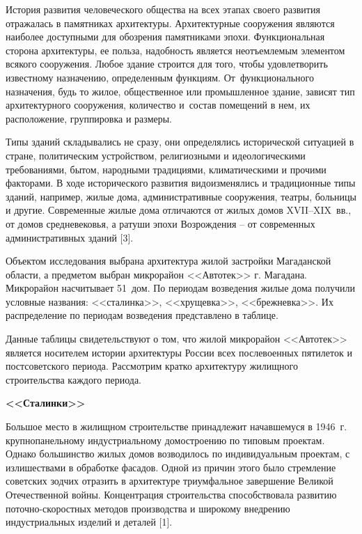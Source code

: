 



\makeProcTitle
{}

История развития человеческого общества на всех этапах своего развития отражалась в памятниках архитектуры. Архитектурные сооружения являются наиболее доступными для обозрения памятниками эпохи. Функциональная сторона архитектуры, ее польза, надобность является неотъемлемым элементом всякого сооружения. Любое здание строится для того, чтобы удовлетворить известному назначению, определенным функциям. От~функционального назначения, будь то жилое, общественное или промышленное здание, зависят тип архитектурного сооружения, количество и~состав помещений в нем, их расположение, группировка и размеры.

Типы зданий складывались не сразу, они определялись исторической ситуацией в стране, политическим устройством, религиозными и идеологическими требованиями, бытом, народными традициями, климатическими и прочими факторами. В ходе исторического развития видоизменялись и традиционные типы зданий, например, жилые дома, административные сооружения, театры, больницы и другие. Современные жилые дома отличаются от жилых домов XVII--XIX~вв., от домов средневековья, а ратуши эпохи Возрождения – от современных административных зданий [3].

Объектом исследования выбрана архитектура жилой застройки Магаданской области, а предметом выбран микрорайон <<Автотек>> г. Магадана. Микрорайон насчитывает 51~дом. По периодам возведения жилые дома получили условные названия: <<сталинка>>, <<хрущевка>>, <<брежневка>>. Их распределение по периодам возведения представлено в таблице.



Данные таблицы свидетельствуют о том, что жилой микрорайон <<Автотек>> является носителем истории архитектуры России всех послевоенных пятилеток и постсоветского периода. Рассмотрим кратко архитектуру жилищного строительства каждого периода.

\textbf{<<Сталинки>>}

Большое место в жилищном строительстве принадлежит начавшемуся в 1946~г. крупнопанельному индустриальному домостроению по типовым проектам. Однако большинство жилых домов возводилось по индивидуальным проектам, с излишествами в обработке фасадов. Одной из причин этого было стремление советских зодчих отразить в архитектуре триумфальное завершение Великой Отечественной войны. Концентрация строительства способствовала развитию поточно-скоростных методов производства и широкому внедрению индустриальных изделий и деталей [1].

